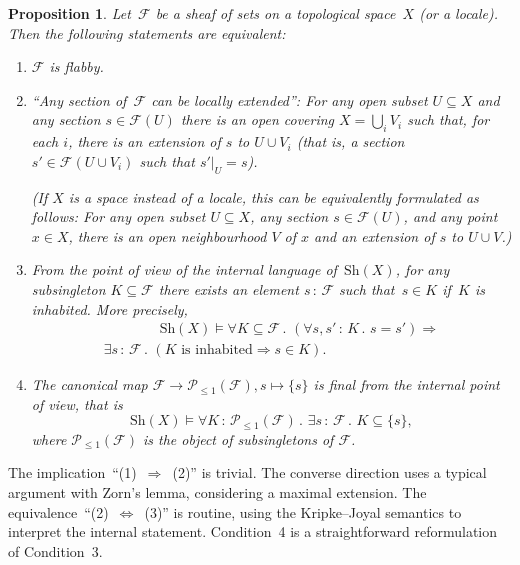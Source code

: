 \documentclass[10pt,reqno,a4paper]{amsbook}
\makeatletter
\theoremstyle{definition}
\theoremstyle{plain}
\newtheorem{prop}[defn]{Proposition}
\theoremstyle{remark}
\newcommand{\F}{\mathcal{F}}
\renewcommand{\P}{\mathcal{P}}
\newcommand{\Sh}{\mathrm{Sh}}
\newcommand{\?}{\,{:}\,}
\renewcommand{\_}{\mathpunct{.}\,}
\renewenvironment{proof}[1][\proofname]{\par
  \pushQED{\qed}%
  \normalfont \topsep6\p@\@plus6\p@\relax
  \trivlist
  \item[\hskip\labelsep
        \itshape
    #1\@addpunct{.}]\ignorespaces
}{%
  \popQED\endtrivlist\@endpefalse
}
\makeatother
\begin{document}
\begin{prop}\label{prop:internal-char-flabbiness}
Let~$\F$ be a sheaf of sets on a topological space~$X$ (or a locale).
Then the following statements are equivalent:
\begin{enumerate}
\item $\F$ is flabby.

\item ``Any section of~$\F$ can be locally extended'':
For any open subset $U \subseteq X$ and any section $s \in \F(U)$ there is
an open covering $X = \bigcup_i V_i$ such that, for each $i$, there is an
extension of $s$ to $U \cup V_i$ (that is, a section $s' \in \F(U \cup V_i)$
such that $s'|_U = s$).

(If $X$ is a space instead of a locale, this can be equivalently formulated as
follows: For any open subset $U \subseteq X$, any section $s \in \F(U)$, and any
point $x \in X$, there is an open neighbourhood $V$ of $x$ and an extension of
$s$ to $U \cup V$.)

\item From the point of view of the internal language of~$\Sh(X)$, for any
subsingleton $K \subseteq \F$ there exists an element $s \? \F$ such that~$s \in
K$ if~$K$ is inhabited. More precisely,
\begin{multline*}
  \qquad\qquad\Sh(X) \models
  \forall K \subseteq \F\_
  (\forall s,s'\?K\_ s = s') \Longrightarrow \\
  \exists s\?\F\_ (\text{$K$ is inhabited} \Rightarrow s \in K).\qquad\qquad
\end{multline*}

\item The canonical map $\F \to \P_{\leq 1}(\F), s \mapsto \{s\}$ is
final from the internal point of view, that is
\[ \Sh(X) \models
  \forall K \? \P_{\leq 1}(\F)\_
  \exists s \? \F\_
  K \subseteq \{s\}, \]
where $\P_{\leq 1}(\F)$ is the object of subsingletons of $\F$.
\end{enumerate}
\end{prop}

\begin{proof}
The implication~``(1)~$\Rightarrow$~(2)'' is trivial. The converse direction uses a
typical argument with Zorn's lemma, considering a maximal extension. The
equivalence~``(2)~$\Leftrightarrow$~(3)'' is routine, using the Kripke--Joyal
semantics to interpret the internal statement. Condition~4 is a straightforward
reformulation of Condition~3.
\end{proof}
\end{document}
